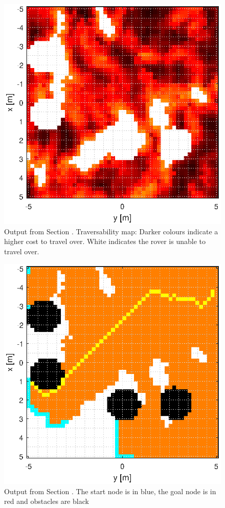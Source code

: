 \documentclass[Space3_Assign3.tex]{subfile}
\begin{document}
\begin{figure}[h]
\centering
\caption{Output from Section . Traversability map: Darker colours indicate a higher cost to travel over. White indicates the rover is unable to travel over.}
\label{Fig:trav}
\includegraphics[width = 0.7\linewidth]{trav.eps}
\end{figure}

\begin{figure}[h]
\centering
\caption{Output from Section . The start node is in blue, the goal node is in red and obstacles are black}
\label{Fig:Dijkstra Algorthim}
\includegraphics[width = 0.7\linewidth]{DijkstraMap.eps}
\end{figure}
\end{document}

